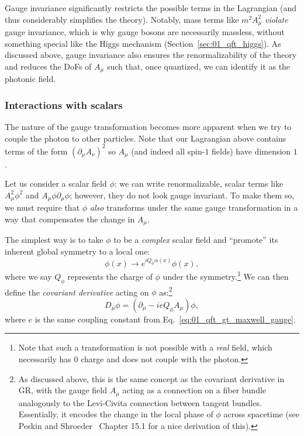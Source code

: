 Gauge invariance significantly restricts the possible terms in the Lagrangian (and thus considerably simplifies the theory).
Notably, mass terms like $m^2A_\mu^2$ \textit{violate} gauge invariance, which is why gauge bosons are necessarily massless, without something special like the Higgs mechanism (Section~\ref{sec:01_qft_higgs}).
As discussed above, gauge invariance also ensures the renormalizability of the theory and reduces the DoFs of $A_\mu$ such that, once quantized, we can identify it as the photonic field.


\subsubsection{Interactions with scalars}

The \UU[1] nature of the gauge transformation becomes more apparent when we try to couple the photon to other particles.
Note that our Lagrangian above contains terms of the form $(\partial_\mu A_\nu)^2$ so $A_\mu$ (and indeed all spin-$1$ fields) have dimension $1$.

Let us consider a scalar field $\phi$: we can write renormalizable, scalar terms like $A_\mu^2\phi^2$ and $A_\mu \phi\partial_\mu\phi$; however, they do not look gauge invariant.
To make them so, we must require that $\phi$ \textit{also} transforms under the same gauge transformation in a way that compensates the change in $A_\mu$.

The simplest way is to take $\phi$ to be a \textit{complex} scalar field and ``promote'' its inherent global \UU[1] symmetry to a local one:
\begin{equation}
	\label{eq:01_qft_gt_maxwell_scalar_gauge}
	\phi(x) \rightarrow e^{iQ_\phi\alpha(x)}\phi(x),
\end{equation}
where we say $Q_\phi$ represents the charge of $\phi$ under the \UU[1] symmetry.\footnote{Note that such a transformation is not possible with a \textit{real} field, which necessarily has $0$ charge and does not couple with the photon.}
We can then define the \textit{covariant derivative} acting on $\phi$ as:\footnote{As discussed above, this is the same concept as the covariant derivative in GR, with the gauge field $A_\mu$ acting as a connection on a \UU[1] fiber bundle analogously to the Levi-Civita connection between tangent bundles.
Essentially, it encodes the change in the local phase of $\phi$ across spacetime (see Peskin and Shroeder~\cite{Peskin:1995ev} Chapter 15.1 for a nice derivation of this).
}
\begin{equation}
	\label{eq:01_qft_gt_maxwell_covariant_derivative}
	D_\mu\phi = (\partial_\mu - ieQ_\phi A_\mu)\phi,
\end{equation}
where $e$ is the same coupling constant from Eq.~\ref{eq:01_qft_gt_maxwell_gauge}.

